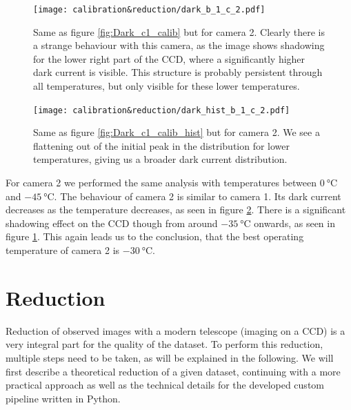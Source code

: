 \documentclass{article}
\begin{document}
\begin{figure}[H]
    \centering
    \texttt{[image: calibration\&reduction/dark\_b\_1\_c\_2.pdf]}
    \caption{Same as figure \ref{fig:Dark_c1_calib} but for camera 2. Clearly there is a strange behaviour with this camera, as the image shows shadowing for the lower right part of the CCD, where a significantly higher dark current is visible. This structure is probably persistent through all temperatures, but only visible for these lower temperatures.}
    \label{fig:Dark_c2_calib}
\end{figure}
\begin{figure}[H]
    \centering
    \texttt{[image: calibration\&reduction/dark\_hist\_b\_1\_c\_2.pdf]}
    \caption{Same as figure \ref{fig:Dark_c1_calib_hist} but for camera 2. We see a flattening out of the initial peak in the distribution for lower temperatures, giving us a broader dark current distribution. }
    \label{fig:Dark_c2_calib_hist}
\end{figure}
For camera 2 we performed the same analysis with temperatures between $\SI{0}{\celsius}$ and $\SI{-45}{\celsius}$. The behaviour of camera 2 is similar to camera 1. Its dark current decreases as the temperature decreases, as seen in figure \ref{fig:Dark_c2_calib_hist}. There is a significant shadowing effect on the CCD though from around $\SI{-35}{\celsius}$ onwards, as seen in figure \ref{fig:Dark_c2_calib}. This again leads us to the conclusion, that the best operating temperature of camera 2 is $\SI{-30}{\celsius}$.
\section{Reduction}\label{sec:reduction}
Reduction of observed images with a modern telescope (imaging on a CCD) is a very integral part for the quality of the dataset. To perform this reduction, multiple steps need to be taken, as will be explained in the following. We will first describe a theoretical reduction of a given dataset, continuing with a more practical approach as well as the technical details for the developed custom pipeline written in Python.
\end{document}
